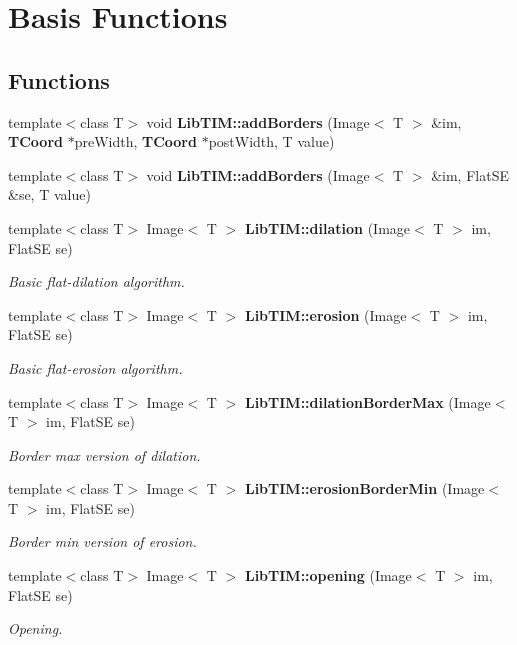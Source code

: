 \section{Basis Functions}
\label{group__basisFunctions}
\subsection*{Functions}
\begin{CompactItemize}
\item 
template$<$class T$>$ void {\bf Lib\-TIM::add\-Borders} (Image$<$ T $>$ \&im, {\bf TCoord} $\ast$pre\-Width, {\bf TCoord} $\ast$post\-Width, T value)
\item 
template$<$class T$>$ void {\bf Lib\-TIM::add\-Borders} (Image$<$ T $>$ \&im, Flat\-SE \&se, T value)
\item 
template$<$class T$>$ Image$<$ T $>$ {\bf Lib\-TIM::dilation} (Image$<$ T $>$ im, Flat\-SE se)
\begin{CompactList}\small\item\em Basic flat-dilation algorithm. \item\end{CompactList}\item 
template$<$class T$>$ Image$<$ T $>$ {\bf Lib\-TIM::erosion} (Image$<$ T $>$ im, Flat\-SE se)
\begin{CompactList}\small\item\em Basic flat-erosion algorithm. \item\end{CompactList}\item 
template$<$class T$>$ Image$<$ T $>$ {\bf Lib\-TIM::dilation\-Border\-Max} (Image$<$ T $>$ im, Flat\-SE se)
\begin{CompactList}\small\item\em Border max version of dilation. \item\end{CompactList}\item 
template$<$class T$>$ Image$<$ T $>$ {\bf Lib\-TIM::erosion\-Border\-Min} (Image$<$ T $>$ im, Flat\-SE se)
\begin{CompactList}\small\item\em Border min version of erosion. \item\end{CompactList}\item 
template$<$class T$>$ Image$<$ T $>$ {\bf Lib\-TIM::opening} (Image$<$ T $>$ im, Flat\-SE se)
\begin{CompactList}\small\item\em Opening. \item\end{CompactList}\item 

\end{CompactItemize}
